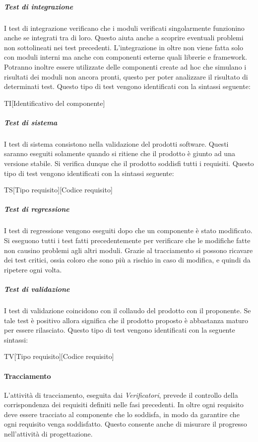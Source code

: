 				 \subparagraph{Test di integrazione}
				 I test di integrazione verificano che i moduli verificati singolarmente funzionino anche se integrati tra di loro. Questo aiuta anche a scoprire eventuali problemi non sottolineati nei test precedenti. L'integrazione in oltre non viene fatta solo con moduli interni ma anche con componenti esterne quali librerie e framework.\\
				 Potranno inoltre essere utilizzate delle componenti create ad hoc che simulano i risultati dei moduli non ancora pronti, questo per poter analizzare il risultato di determinati test. Questo tipo di test vengono identificati con la sintassi seguente:\\
				 \begin{center}
				 	TI[Identificativo del componente]
				 \end{center}

				 \subparagraph{Test di sistema}
				 I test di sistema consistono nella validazione del prodotti software. Questi saranno eseguiti solamente quando si ritiene che il prodotto è giunto ad una versione stabile. Si verifica dunque che il prodotto soddisfi tutti i requisiti. Questo tipo di test vengono identificati con la sintassi seguente: \\
				\begin{center}
				 	TS[Tipo requisito][Codice requisito]
				 \end{center}

				 \subparagraph{Test di regressione}
				 I test di regressione vengono eseguiti dopo che un componente è stato modificato. Si eseguono tutti i test fatti precedentemente per verificare che le modifiche fatte non causino problemi agli altri moduli. Grazie al tracciamento si possono ricavare dei test critici, ossia coloro che sono più a rischio in caso di modifica, e quindi da ripetere ogni volta.
				
				 \subparagraph{Test di validazione}
				 \label{subp:validazione}
				 I test di validazione coincidono con il collaudo del prodotto con il proponente. Se tale test è positivo allora significa che il prodotto proposto è abbastanza maturo per essere rilasciato. Questo tipo di test vengono identificati con la seguente sintassi:\\
				 \begin{center}
				 	TV[Tipo requisito][Codice requisito]
				 \end{center}

			\paragraph{Tracciamento} %
			\label{par:tracciamento}
			L'attività di tracciamento, eseguita dai \emph{Verificatori}, prevede il controllo della corrispondenza dei requisiti definiti nelle fasi precedenti. In oltre ogni requisito deve essere tracciato al componente che lo soddisfa, in modo da garantire che ogni requisito venga soddisfatto. Questo consente anche di misurare il progresso nell'attività di progettazione.


